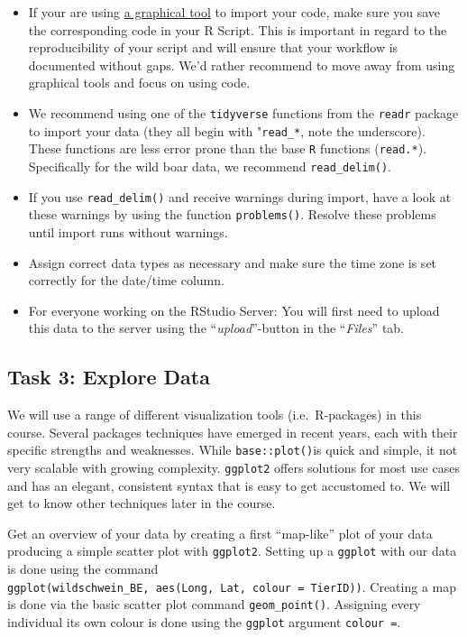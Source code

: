 \documentclass[]{book}
\providecommand{\tightlist}{%
  \setlength{\itemsep}{0pt}\setlength{\parskip}{0pt}}
\begin{document}
\begin{itemize}
\tightlist
\item
  If your are using \href{https://support.rstudio.com/hc/en-us/articles/218611977-Importing-Data-with-RStudio}{a graphical tool} to import your code, make sure you save the corresponding code in your R Script. This is important in regard to the reproducibility of your script and will ensure that your workflow is documented without gaps. We'd rather recommend to move away from using graphical tools and focus on using code.
\item
  We recommend using one of the \texttt{tidyverse} functions from the \texttt{readr} package to import your data (they all begin with "\texttt{read\_*}, note the underscore). These functions are less error prone than the base \texttt{R} functions (\texttt{read.*}). Specifically for the wild boar data, we recommend \texttt{read\_delim()}.
\item
  If you use \texttt{read\_delim()} and receive warnings during import, have a look at these warnings by using the function \texttt{problems()}. Resolve these problems until import runs without warnings.
\item
  Assign correct data types as necessary and make sure the time zone is set correctly for the date/time column.
\item
  For everyone working on the RStudio Server: You will first need to upload this data to the server using the ``\emph{upload}''-button in the ``\emph{Files}'' tab.
\end{itemize}

\hypertarget{task-3-explore-data}{%
\subsection{Task 3: Explore Data}\label{task-3-explore-data}}

We will use a range of different visualization tools (i.e.~R-packages) in this course. Several packages techniques have emerged in recent years, each with their specific strengths and weaknesses. While \texttt{base::plot()}is quick and simple, it not very scalable with growing complexity. \texttt{ggplot2} offers solutions for most use cases and has an elegant, consistent syntax that is easy to get accustomed to. We will get to know other techniques later in the course.

Get an overview of your data by creating a first ``map-like'' plot of your data producing a simple scatter plot with \texttt{ggplot2}.
Setting up a \texttt{ggplot} with our data is done using the command \texttt{ggplot(wildschwein\_BE,\ aes(Long,\ Lat,\ colour\ =\ TierID))}. Creating a map is done via the basic scatter plot command \texttt{geom\_point()}.
Assigning every individual its own colour is done using the \texttt{ggplot} argument \texttt{colour\ =}.
\end{document}
